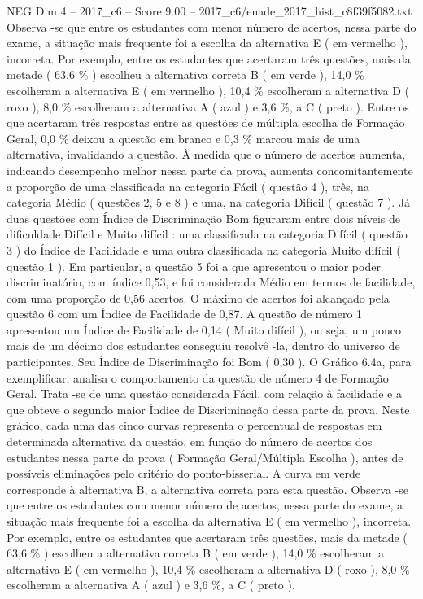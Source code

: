 \begin{textsample}{NEG Dim 4 – 2017\_c6 – Score 9.00 – 2017\_c6/enade\_2017\_hist\_c8f39f5082.txt}
Observa -se que entre os estudantes com menor número de acertos, nessa parte do exame, a situação mais frequente foi a escolha da alternativa E ( em vermelho ), incorreta.
Por exemplo, entre os estudantes que acertaram três questões, mais da metade ( 63,6 \% ) escolheu a alternativa correta B ( em verde ), 14,0 \% escolheram a alternativa E ( em vermelho ), 10,4 \% escolheram a alternativa D ( roxo ), 8,0 \% escolheram a alternativa A ( azul ) e 3,6 \%, a C ( preto ).
Entre os que acertaram três respostas entre as questões de múltipla escolha de Formação Geral, 0,0 \% deixou a questão em branco e 0,3 \% marcou mais de uma alternativa, invalidando a questão.
À medida que o número de acertos aumenta, indicando desempenho melhor nessa parte da prova, aumenta concomitantemente a proporção de uma classificada na categoria Fácil ( questão 4 ), três, na categoria Médio ( questões 2, 5 e 8 ) e uma, na categoria Difícil ( questão 7 ).
Já duas questões com Índice de Discriminação Bom figuraram entre dois níveis de dificuldade Difícil e Muito difícil : uma classificada na categoria Difícil ( questão 3 ) do Índice de Facilidade e uma outra classificada na categoria Muito difícil ( questão 1 ).
Em particular, a questão 5 foi a que apresentou o maior poder discriminatório, com índice 0,53, e foi considerada Médio em termos de facilidade, com uma proporção de 0,56 acertos.
O máximo de acertos foi alcançado pela questão 6 com um Índice de Facilidade de 0,87.
A questão de número 1 apresentou um Índice de Facilidade de 0,14 ( Muito difícil ), ou seja, um pouco mais de um décimo dos estudantes conseguiu resolvê -la, dentro do universo de participantes.
Seu Índice de Discriminação foi Bom ( 0,30 ).
O Gráfico 6.4a, para exemplificar, analisa o comportamento da questão de número 4 de Formação Geral.
Trata -se de uma questão considerada Fácil, com relação à facilidade e a que obteve o segundo maior Índice de Discriminação dessa parte da prova.
Neste gráfico, cada uma das cinco curvas representa o percentual de respostas em determinada alternativa da questão, em função do número de acertos dos estudantes nessa parte da prova ( Formação Geral/Múltipla Escolha ), antes de possíveis eliminações pelo critério do ponto-bisserial.
A curva em verde corresponde à alternativa B, a alternativa correta para esta questão.
Observa -se que entre os estudantes com menor número de acertos, nessa parte do exame, a situação mais frequente foi a escolha da alternativa E ( em vermelho ), incorreta.
Por exemplo, entre os estudantes que acertaram três questões, mais da metade ( 63,6 \% ) escolheu a alternativa correta B ( em verde ), 14,0 \% escolheram a alternativa E ( em vermelho ), 10,4 \% escolheram a alternativa D ( roxo ), 8,0 \% escolheram a alternativa A ( azul ) e 3,6 \%, a C ( preto ).

\end{textsample}
